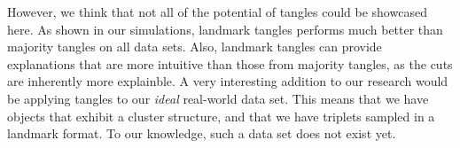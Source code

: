 However, we think that not all of the potential of tangles could be showcased here. 
As shown in our simulations, landmark tangles performs much better than majority tangles on all data sets.
Also, landmark tangles can provide explanations that are more intuitive than those from majority tangles,
as the cuts are inherently more explainble. A very interesting addition to our research would 
be applying tangles to our \textit{ideal} real-world data set. This means that we have objects
that exhibit a cluster structure, and that we have triplets sampled in a landmark format.
To our knowledge, such a data set does not exist yet.

